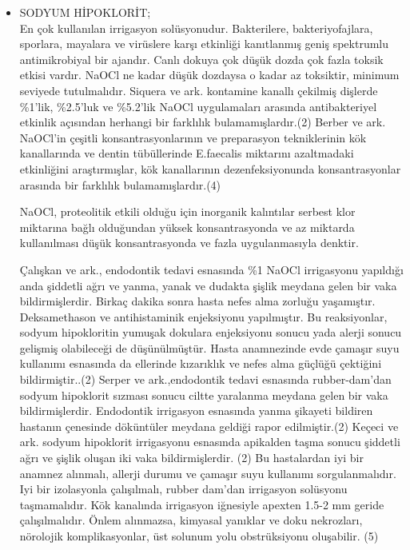 \begin{itemize}
   \item SODYUM HİPOKLORİT;\\
   En çok kullanılan irrigasyon solüsyonudur. Bakterilere, bakteriyofajlara, sporlara, mayalara ve virüslere karşı etkinliği kanıtlanmış geniş spektrumlu antimikrobiyal bir ajandır. Canlı dokuya çok düşük dozda çok fazla toksik etkisi vardır. NaOCl ne kadar düşük dozdaysa o kadar az toksiktir, minimum seviyede tutulmalıdır.
Siquera ve ark. kontamine kanallı çekilmiş dişlerde \%1’lik, \%2.5’luk ve \%5.2’lik NaOCl uygulamaları arasında antibakteriyel etkinlik açısından herhangi bir farklılık bulamamışlardır.(2)
Berber ve ark. NaOCl’in çeşitli konsantrasyonlarının ve preparasyon tekniklerinin kök kanallarında ve dentin tübüllerinde E.faecalis miktarını azaltmadaki etkinliğini araştırmışlar, kök kanallarının dezenfeksiyonunda konsantrasyonlar arasında bir farklılık bulamamışlardır.(4)

NaOCl, proteolitik etkili olduğu için inorganik kalıntılar serbest klor miktarına bağlı olduğundan yüksek konsantrasyonda ve az miktarda kullanılması düşük konsantrasyonda ve fazla uygulanmasıyla denktir.

Çalışkan ve ark., endodontik tedavi esnasında \%1 NaOCl irrigasyonu yapıldığı anda şiddetli ağrı ve yanma, yanak ve dudakta şişlik meydana gelen bir vaka bildirmişlerdir. Birkaç dakika sonra hasta nefes alma zorluğu yaşamıştır. Deksamethason ve antihistaminik enjeksiyonu yapılmıştır. Bu reaksiyonlar, sodyum hipokloritin yumuşak dokulara enjeksiyonu sonucu yada alerji sonucu gelişmiş olabileceği de düşünülmüştür. Hasta anamnezinde evde çamaşır suyu kullanımı esnasında da ellerinde kızarıklık ve nefes alma güçlüğü çektiğini bildirmiştir..(2)
Serper ve ark.,endodontik tedavi esnasında rubber-dam’dan sodyum hipoklorit sızması sonucu ciltte yaralanma meydana gelen bir vaka bildirmişlerdir. Endodontik irrigasyon esnasında yanma şikayeti bildiren hastanın çenesinde döküntüler meydana geldiği rapor edilmiştir.(2)
Keçeci ve ark. sodyum hipoklorit irrigasyonu esnasında apikalden taşma sonucu şiddetli ağrı ve şişlik oluşan iki vaka bildirmişlerdir. (2)
Bu hastalardan iyi bir anamnez alınmalı, allerji durumu ve çamaşır suyu kullanımı sorgulanmalıdır.
Iyi bir izolasyonla çalışılmalı, rubber dam’dan irrigasyon solüsyonu taşmamalıdır.
Kök kanalında irrigasyon iğnesiyle apexten 1.5-2 mm geride çalışılmalıdır.
Önlem alınmazsa, kimyasal yanıklar ve doku nekrozları, nörolojik komplikasyonlar, üst solunum yolu obstrüksiyonu oluşabilir. (5)


\end{itemize}
